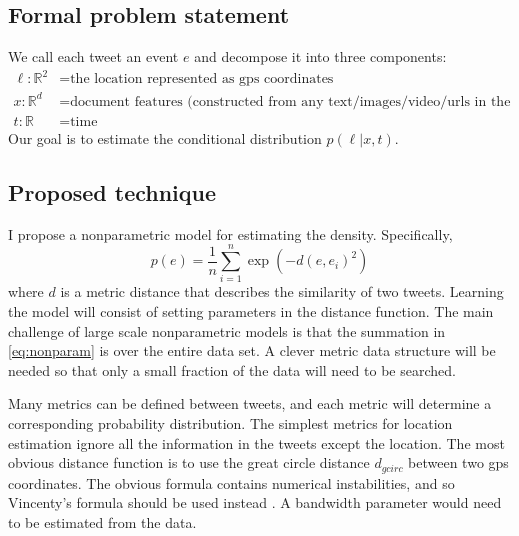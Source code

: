 \documentclass[sigconf,10pt]{acmart}
\newcommand{\R}{\mathbb{R}}
\newcommand{\dist}{d}
\newcommand{\gmap}{_{\textit{gmap}}}
\newcommand{\gcirc}{_\textit{gcirc}}
\newcommand{\prob}[1]{p\!\left({#1}\right)}
\newcommand{\cprob}[2]{\prob{{#1} | {#2}}}
\begin{document}
{\subsection {Formal problem statement}

We call each tweet an event $e$ and decompose it into three components: 
\begin{align*}
    \ell : \R^2 &= \text{the location represented as gps coordinates} \\
    x    : \R^d &= \text{document features (constructed from any text/images/video/urls in the tweet)} \\
    t    : \R~ &= \text{time}
\end{align*}
Our goal is to estimate the conditional distribution $\cprob{\ell}{x,t}$.


\subsection {Proposed technique}

I propose a nonparametric model for estimating the density.
Specifically, 
\begin{equation}
    \label{eq:nonparam}
    \prob{e} = \frac 1 n \sum_{i=1}^n \exp(-\dist(e,e_i)^2)
\end{equation}
where $\dist$ is a metric distance that describes the similarity of two tweets.
Learning the model will consist of setting parameters in the distance function.
The main challenge of large scale nonparametric models is that the summation in \eqref{eq:nonparam} is over the entire data set.
A clever metric data structure will be needed so that only a small fraction of the data will need to be searched.

Many metrics can be defined between tweets,
and each metric will determine a corresponding probability distribution.
The simplest metrics for location estimation ignore all the information in the tweets except the location.
The most obvious distance function is to use the great circle distance $\dist\gcirc$ between two gps coordinates.
The obvious formula contains numerical instabilities,
and so Vincenty's formula should be used instead \citep{vincenty1975direct}.
A bandwidth parameter would need to be estimated from the data.

}
\end{document}
